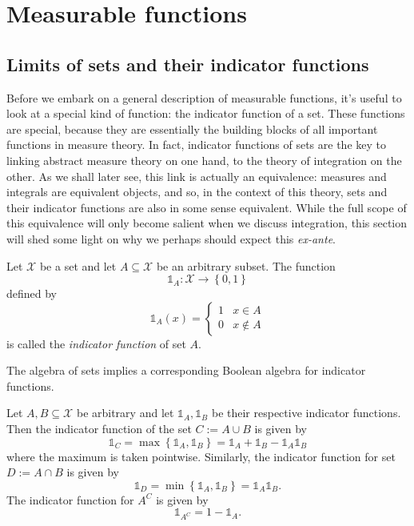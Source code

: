 
\chapter{Measurable functions\label{chap:measurableFunctions}}

\section{Limits of sets and their indicator functions}

Before we embark on a general description of measurable functions,
it's useful to look at a special kind of function: the indicator function
of a set. These functions are special, because they are essentially
the building blocks of all important functions in measure theory.
In fact, indicator functions of sets are the key to linking abstract
measure theory on one hand, to the theory of integration on the other.
As we shall later see, this link is actually an equivalence: measures
and integrals are equivalent objects, and so, in the context of this
theory, sets and their indicator functions are also in some sense
equivalent. While the full scope of this equivalence will only become
salient when we discuss integration, this section will shed some light
on why we perhaps should expect this \emph{ex-ante}.
\begin{defn}
\label{def:indicatorFunction}Let $\mathcal{X}$ be a set and let
$A\subseteq\mathcal{X}$ be an arbitrary subset. The function 
\[
\mathds{1}_{A}:\mathcal{X}\longrightarrow\left\{ 0,1\right\} 
\]
defined by
\[
\mathds{1}_{A}\left(x\right)=\begin{cases}
1 & x\in A\\
0 & x\notin A
\end{cases}
\]
is called the \emph{indicator function }of set $A$.
\end{defn}

The algebra of sets implies a corresponding Boolean algebra for indicator
functions.
\begin{fact}
\label{fact:indicatorFunctionsFiniteOperations}Let $A,B\subseteq\mathcal{X}$
be arbitrary and let $\mathds{1}_{A},\mathds{1}_{B}$ be their respective
indicator functions. Then the indicator function of the set $C:=A\cup B$
is given by
\[
\mathds{1}_{C}=\max\left\{ \mathds{1}_{A},\mathds{1}_{B}\right\} =\mathds{1}_{A}+\mathds{1}_{B}-\mathds{1}_{A}\mathds{1}_{B}
\]
where the maximum is taken pointwise. Similarly, the indicator function
for set $D:=A\cap B$ is given by
\[
\mathds{1}_{D}=\min\left\{ \mathds{1}_{A},\mathds{1}_{B}\right\} =\mathds{1}_{A}\mathds{1}_{B}.
\]
The indicator function for $A^{C}$ is given by
\[
\mathds{1}_{A^{C}}=1-\mathds{1}_{A}.
\]
\end{fact}

